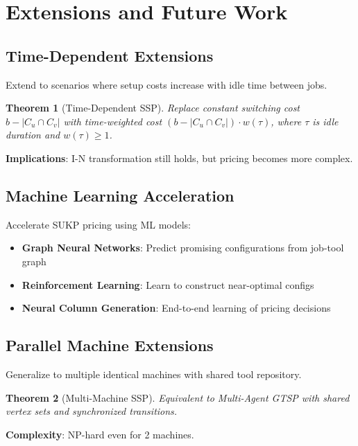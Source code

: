 \documentclass[12pt]{article}
\newtheorem{theorem}{Theorem}[section]
\begin{document}
	\section{Extensions and Future Work}
	
	\subsection{Time-Dependent Extensions}
	
	Extend to scenarios where setup costs increase with idle time between jobs.
	
	\begin{theorem}[Time-Dependent SSP]
		Replace constant switching cost $b - |C_u \cap C_v|$ with time-weighted cost $(b - |C_u \cap C_v|) \cdot w(\tau)$, where $\tau$ is idle duration and $w(\tau) \ge 1$.
	\end{theorem}
	
	\textbf{Implications}: I-N transformation still holds, but pricing becomes more complex.
	
	\subsection{Machine Learning Acceleration}
	
	Accelerate SUKP pricing using ML models:
	\begin{itemize}
		\item \textbf{Graph Neural Networks}: Predict promising configurations from job-tool graph
		\item \textbf{Reinforcement Learning}: Learn to construct near-optimal configs
		\item \textbf{Neural Column Generation}: End-to-end learning of pricing decisions
	\end{itemize}
	
	\subsection{Parallel Machine Extensions}
	
	Generalize to multiple identical machines with shared tool repository.
	
	\begin{theorem}[Multi-Machine SSP]
		Equivalent to Multi-Agent GTSP with shared vertex sets and synchronized transitions.
	\end{theorem}
	
	\textbf{Complexity}: NP-hard even for 2 machines.
	
\end{document}

